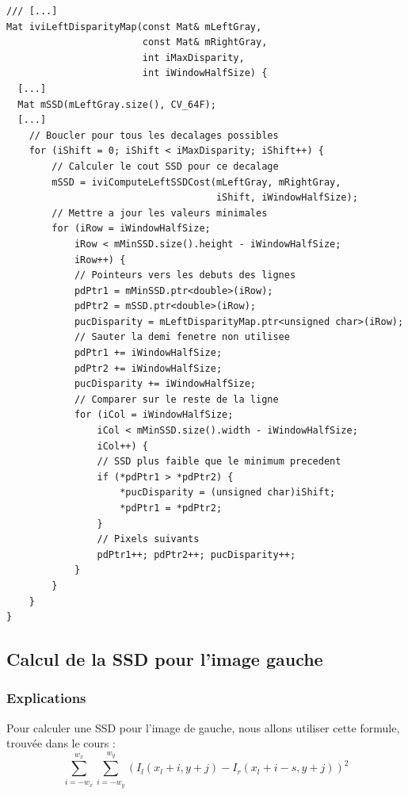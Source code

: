 \documentclass[a4paper]{article}
\begin{document}
\begin{lstlisting}
/// [...]
Mat iviLeftDisparityMap(const Mat& mLeftGray,
                        const Mat& mRightGray,
                        int iMaxDisparity,
                        int iWindowHalfSize) {
  [...]
  Mat mSSD(mLeftGray.size(), CV_64F);
  [...]
    // Boucler pour tous les decalages possibles
    for (iShift = 0; iShift < iMaxDisparity; iShift++) {
        // Calculer le cout SSD pour ce decalage
        mSSD = iviComputeLeftSSDCost(mLeftGray, mRightGray,
                                     iShift, iWindowHalfSize);
        // Mettre a jour les valeurs minimales
        for (iRow = iWindowHalfSize;
            iRow < mMinSSD.size().height - iWindowHalfSize;
            iRow++) {
            // Pointeurs vers les debuts des lignes
            pdPtr1 = mMinSSD.ptr<double>(iRow);
            pdPtr2 = mSSD.ptr<double>(iRow);
            pucDisparity = mLeftDisparityMap.ptr<unsigned char>(iRow);
            // Sauter la demi fenetre non utilisee
            pdPtr1 += iWindowHalfSize;
            pdPtr2 += iWindowHalfSize;
            pucDisparity += iWindowHalfSize;
            // Comparer sur le reste de la ligne
            for (iCol = iWindowHalfSize;
                iCol < mMinSSD.size().width - iWindowHalfSize;
                iCol++) {
                // SSD plus faible que le minimum precedent
                if (*pdPtr1 > *pdPtr2) {
                    *pucDisparity = (unsigned char)iShift;
                    *pdPtr1 = *pdPtr2;
                }
                // Pixels suivants
                pdPtr1++; pdPtr2++; pucDisparity++;
            }
        }
    }
}
\end{lstlisting}

\subsection{Calcul de la SSD pour l'image gauche}

\subsubsection{Explications}
Pour calculer une SSD pour l'image de gauche, nous allons utiliser cette formule, trouvée dans le cours :
\begin{equation}
\sum_{i=-w_x}^{w_x} \sum_{i=-w_y}^{w_y} (I_l(x_l+i,y+j)-I_r(x_l+i-s,y+j))^2
\end{equation}
\end{document}
